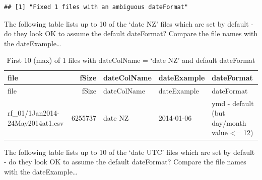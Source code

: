 \documentclass[]{article}
\newenvironment{Shaded}{\begin{snugshade}}{\end{snugshade}}
\newcommand{\KeywordTok}[1]{\textcolor[rgb]{0.13,0.29,0.53}{\textbf{#1}}}
\newcommand{\DataTypeTok}[1]{\textcolor[rgb]{0.13,0.29,0.53}{#1}}
\newcommand{\DecValTok}[1]{\textcolor[rgb]{0.00,0.00,0.81}{#1}}
\newcommand{\StringTok}[1]{\textcolor[rgb]{0.31,0.60,0.02}{#1}}
\newcommand{\CommentTok}[1]{\textcolor[rgb]{0.56,0.35,0.01}{\textit{#1}}}
\newcommand{\OperatorTok}[1]{\textcolor[rgb]{0.81,0.36,0.00}{\textbf{#1}}}
\newcommand{\NormalTok}[1]{#1}
\begin{document}
\begin{verbatim}
## [1] "Fixed 1 files with an ambiguous dateFormat"
\end{verbatim}

The following table lists up to 10 of the `date NZ' files which are set
by default - do they look OK to assume the default dateFormat? Compare
the file names with the dateExample\ldots{}

\begin{Shaded}
\end{Shaded}

\begin{longtable}[]{@{}lrlll@{}}
\caption{First 10 (max) of 1 files with dateColName = `date NZ' and
default dateFormat}\tabularnewline
\toprule
file & fSize & dateColName & dateExample & dateFormat\tabularnewline
\midrule
\endfirsthead
\toprule
file & fSize & dateColName & dateExample & dateFormat\tabularnewline
\midrule
\endhead
rf\_01/1Jan2014-24May2014at1.csv & 6255737 & date NZ & 2014-01-06 & ymd
- default (but day/month value \textless{}= 12)\tabularnewline
\bottomrule
\end{longtable}

The following table lists up to 10 of the `date UTC' files which are set
by default - do they look OK to assume the default dateFormat? Compare
the file names with the dateExample\ldots{}

\begin{Shaded}
\end{Shaded}
\end{document}
